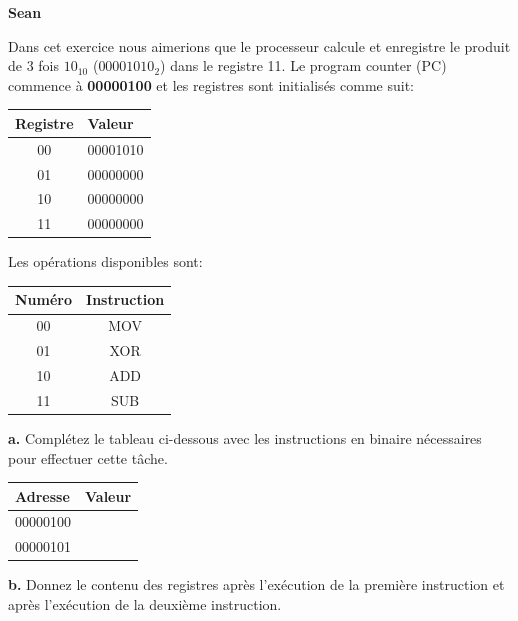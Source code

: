 

\begin{Exercice}[10 minutes]\textbf{Sean}

Dans cet exercice nous aimerions que le processeur calcule et enregistre le produit de 3 fois $10_{10}$ ($00001010_2$) dans le registre 11. Le program counter (PC) commence à \textbf{00000100} et les registres sont initialisés comme suit:

\begin{center}
\begin{tabular}{|c|l|}
\hline
\textbf{Registre} & \textbf{Valeur} \\
\hline
00 & 00001010 \\ \hline
01 & 00000000 \\ \hline
10 & 00000000 \\ \hline
11 & 00000000 \\ 
\hline
\end{tabular}
\end{center}

Les opérations disponibles sont:

\begin{center}
\begin{tabular}{|c|c|}
\hline
\textbf{Numéro} & \textbf{Instruction} \\
\hline
00 & MOV \\ \hline
01 & XOR \\ \hline
10 & ADD \\ \hline
11 & SUB \\ 
\hline
\end{tabular}
\end{center}

\bigskip %

\noindent %
\textbf{a.} Complétez le tableau ci-dessous avec les instructions en binaire nécessaires pour effectuer cette tâche.

\begin{center}
\begin{tabular}{|l|l|}
\hline
\textbf{Adresse} & \textbf{Valeur} \\
\hline
00000100 & \\ \hline
00000101 & \\ 
\hline
\end{tabular}
\end{center}

\bigskip

\noindent %
\textbf{b.} Donnez le contenu des registres après l'exécution de la première instruction et après l'exécution de la deuxième instruction.


\end{Exercice}
